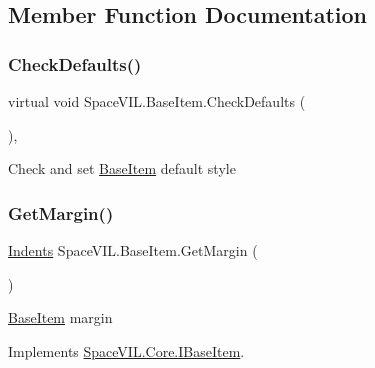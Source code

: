 \subsection{Member Function Documentation}
\mbox{\label{class_space_v_i_l_1_1_base_item_a66974390b46c82f1a4c4d54c141559d5}} 
\subsubsection{\texorpdfstring{Check\+Defaults()}{CheckDefaults()}}
{\footnotesize\ttfamily virtual void Space\+V\+I\+L.\+Base\+Item.\+Check\+Defaults (\begin{DoxyParamCaption}{ }\end{DoxyParamCaption})\hspace{0.3cm}{\ttfamily [inline]}, {\ttfamily [virtual]}}



Check and set \mbox{\hyperlink{class_space_v_i_l_1_1_base_item}{Base\+Item}} default style 

\mbox{\label{class_space_v_i_l_1_1_base_item_ab470c6d47d0c5c9e218424a9054c4b53}} 
\subsubsection{\texorpdfstring{Get\+Margin()}{GetMargin()}}
{\footnotesize\ttfamily \mbox{\hyperlink{struct_space_v_i_l_1_1_decorations_1_1_indents}{Indents}} Space\+V\+I\+L.\+Base\+Item.\+Get\+Margin (\begin{DoxyParamCaption}{ }\end{DoxyParamCaption})\hspace{0.3cm}{\ttfamily [inline]}}



\mbox{\hyperlink{class_space_v_i_l_1_1_base_item}{Base\+Item}} margin 



Implements \mbox{\hyperlink{interface_space_v_i_l_1_1_core_1_1_i_base_item}{Space\+V\+I\+L.\+Core.\+I\+Base\+Item}}.

